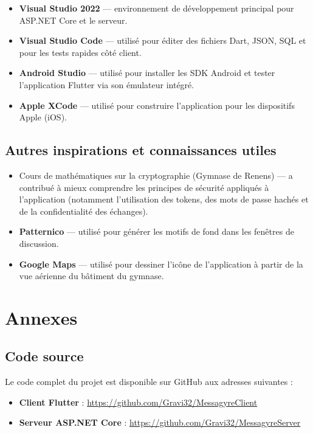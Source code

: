 \documentclass[12pt]{report}
\begin{document}
	\begin{itemize}
		\item \textbf{Visual Studio 2022} — environnement de développement principal pour ASP.NET Core et le serveur.
		\item \textbf{Visual Studio Code} — utilisé pour éditer des fichiers Dart, JSON, SQL et pour les tests rapides côté client.
		\item \textbf{Android Studio} — utilisé pour installer les SDK Android et tester l’application Flutter via son émulateur intégré.
		\item \textbf{Apple XCode} — utilisé pour construire l'application pour les dispositifs Apple (iOS).
	\end{itemize}
	
	\section{Autres inspirations et connaissances utiles}
	
	\begin{itemize}
		\item Cours de mathématiques sur la cryptographie (Gymnase de Renens) — a contribué à mieux comprendre les principes de sécurité appliqués à l’application (notamment l’utilisation des tokens, des mots de passe hachés et de la confidentialité des échanges).
		\item \textbf{Patternico} — utilisé pour générer les motifs de fond dans les fenêtres de discussion.
		\item \textbf{Google Maps} — utilisé pour dessiner l’icône de l’application à partir de la vue aérienne du bâtiment du gymnase.
	\end{itemize}
	
	\chapter{Annexes}
	
	\section{Code source}
	
	Le code complet du projet est disponible sur GitHub aux adresses suivantes :
	
	\begin{itemize}
		\item \textbf{Client Flutter} : \url{https://github.com/Gravi32/MessagyreClient}
		\item \textbf{Serveur ASP.NET Core} : \url{https://github.com/Gravi32/MessagyreServer}
	\end{itemize}
	
\end{document}
